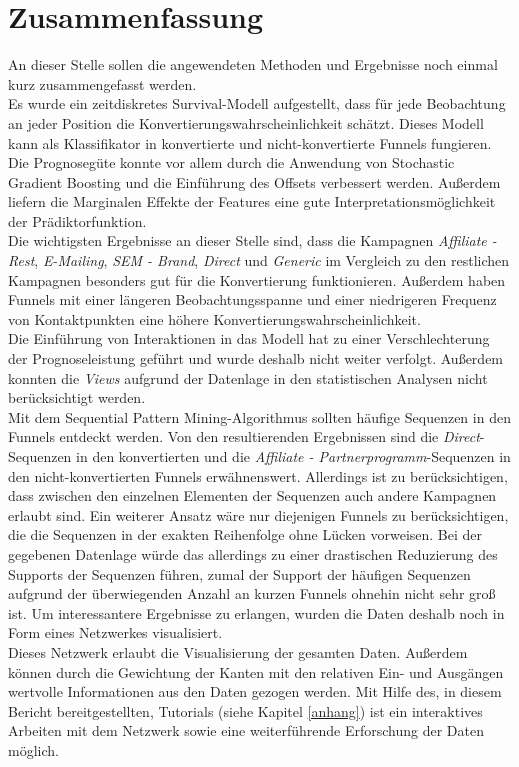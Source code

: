 \section{Zusammenfassung}\label{zusammenfassung}

An dieser Stelle sollen die angewendeten Methoden und Ergebnisse noch einmal kurz zusammengefasst werden.\\
Es wurde ein zeitdiskretes Survival-Modell aufgestellt, dass für jede Beobachtung an jeder Position die Konvertierungswahrscheinlichkeit schätzt. Dieses Modell kann als Klassifikator in konvertierte und nicht-konvertierte Funnels fungieren. Die Prognosegüte konnte vor allem durch die Anwendung von Stochastic Gradient Boosting und die Einführung des Offsets verbessert werden. Außerdem liefern die Marginalen Effekte der Features eine gute Interpretationsmöglichkeit der Prädiktorfunktion.\\
Die wichtigsten Ergebnisse an dieser Stelle sind, dass die Kampagnen \textit{Affiliate - Rest}, \textit{E-Mailing}, \textit{SEM - Brand}, \textit{Direct} und \textit{Generic} im Vergleich zu den restlichen Kampagnen besonders gut für die Konvertierung funktionieren. Außerdem haben Funnels mit einer längeren Beobachtungsspanne und einer niedrigeren Frequenz von Kontaktpunkten eine höhere Konvertierungswahrscheinlichkeit.\\
Die Einführung von Interaktionen in das Modell hat zu einer Verschlechterung der Prognoseleistung geführt und wurde deshalb nicht weiter verfolgt. Außerdem konnten die \textit{Views} aufgrund der Datenlage in den statistischen Analysen nicht berücksichtigt werden.\\
Mit dem Sequential Pattern Mining-Algorithmus sollten häufige Sequenzen in den Funnels entdeckt werden. Von den resultierenden Ergebnissen sind die \textit{Direct}-Sequenzen in den konvertierten und die \textit{Affiliate - Partnerprogramm}-Sequenzen in den nicht-konvertierten Funnels erwähnenswert. Allerdings ist zu berücksichtigen, dass zwischen den einzelnen Elementen der Sequenzen auch andere Kampagnen erlaubt sind. Ein weiterer Ansatz wäre nur diejenigen Funnels zu berücksichtigen, die die Sequenzen in der exakten Reihenfolge ohne Lücken vorweisen. Bei der gegebenen Datenlage würde das allerdings zu einer drastischen Reduzierung des Supports der Sequenzen führen, zumal der Support der häufigen Sequenzen aufgrund der überwiegenden Anzahl an kurzen Funnels ohnehin nicht sehr groß ist. Um interessantere Ergebnisse zu erlangen, wurden die Daten deshalb noch in Form eines Netzwerkes visualisiert.\\
Dieses Netzwerk erlaubt die Visualisierung der gesamten Daten. Außerdem können durch die Gewichtung der Kanten mit den relativen Ein- und Ausgängen wertvolle Informationen aus den Daten gezogen werden. Mit Hilfe des, in diesem Bericht bereitgestellten, Tutorials (siehe Kapitel \ref{anhang}) ist ein interaktives Arbeiten mit dem Netzwerk sowie eine weiterführende Erforschung der Daten möglich.